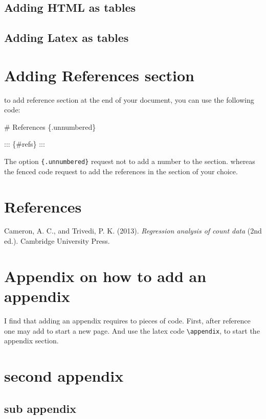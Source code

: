 \documentclass[
  11pts,
]{article}
\newenvironment{Shaded}{\begin{snugshade}}{\end{snugshade}}
\newcommand{\FunctionTok}[1]{\textcolor[rgb]{0.28,0.35,0.67}{#1}}
\newcommand{\NormalTok}[1]{\textcolor[rgb]{0.00,0.23,0.31}{#1}}
\newlength{\cslhangindent}
\newenvironment{CSLReferences}[2] %
 {\begin{list}{}{%
  \setlength{\itemindent}{0pt}
  \setlength{\leftmargin}{0pt}
  \setlength{\parsep}{0pt}
  \ifodd #1
   \setlength{\leftmargin}{\cslhangindent}
   \setlength{\itemindent}{-1\cslhangindent}
  \fi
  \setlength{\itemsep}{#2\baselineskip}}}
 {\end{list}}
\begin{document}
\subsection{Adding HTML as tables}\label{adding-html-as-tables}

\subsection{Adding Latex as tables}\label{adding-latex-as-tables}

\section{Adding References section}\label{adding-references-section}

to add reference section at the end of your document, you can use the
following code:

\begin{Shaded}
\begin{Highlighting}[]
\FunctionTok{\# References \{.unnumbered\}}

\NormalTok{::: \{\#refs\}}
\NormalTok{:::}
\end{Highlighting}
\end{Shaded}

The option \texttt{\{.unnumbered\}} request not to add a number to the
section. whereas the fenced code request to add the references in the
section of your choice.

\section*{References}\label{references}

\label{refs}
\begin{CSLReferences}{1}{0}
Cameron, A. C., and Trivedi, P. K. (2013). \emph{Regression analysis of
count data} (2nd ed.). Cambridge University Press.

\end{CSLReferences}

\newpage{}

\appendix

\section{Appendix on how to add an
appendix}\label{appendix-on-how-to-add-an-appendix}

I find that adding an appendix requires to pieces of code. First, after
reference one may add \texttt{} to start a new page. And use the latex
code \texttt{\textbackslash{}appendix}, to start the appendix section.

\section{second appendix}\label{second-appendix}

\subsection{sub appendix}\label{sub-appendix}
\end{document}
